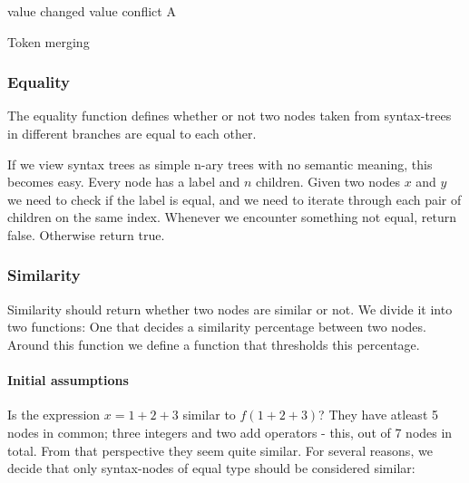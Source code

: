 \documentclass[11pt]{article}
\begin{document}
\begin{algorithm}
\begin{algorithmic}
        \State \Return value
    \EndIf
        \State \Return changed value
    \EndIf
            \State \Return conflict
	    \EndIf
        \State \Return A
    \EndIf
\EndFunction
\end{algorithmic}
  \caption{Token merging}
  \label{MergeToken}
\end{algorithm}

\subsubsection{Equality}
The equality function defines whether or not two nodes taken from syntax-trees in different branches are equal to each other.

If we view syntax trees as simple n-ary trees with no semantic meaning, this becomes easy. Every node has a label and $n$ children. Given two nodes $x$ and $y$ we need to check if the label is equal, and we need to iterate through each pair of children on the same index. Whenever we encounter something not equal, return false. Otherwise return true.

\subsubsection{Similarity}
\label{FunctionSimilarity}
Similarity should return whether two nodes are similar or not. We divide it into two functions:  One that decides a similarity percentage between two nodes. Around this function we define a function that thresholds this percentage.

\paragraph{Initial assumptions} Is the expression $x=1+2+3$ similar to $f(1+2+3)$? They have atleast 5 nodes in common; three integers and two add operators - this, out of 7 nodes in total. From that perspective they seem quite similar. For several reasons, we decide that only syntax-nodes of equal type should be considered similar:
\end{document}
